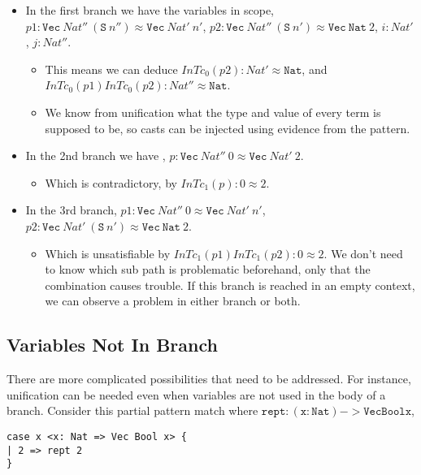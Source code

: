 \begin{itemize}
\item
In the first branch we have the variables in scope, $p1:\mathtt{Vec}\ Nat''\ (\mathtt{S}\ n'')\approx\mathtt{Vec}\ Nat'\ n'$, $p2:\mathtt{Vec}\ Nat''\ (\mathtt{S}\ n')\approx\mathtt{Vec}\ \mathtt{Nat}\ 2$, $i:Nat'$, $j:Nat''$.
\begin{itemize}
\item
This means we can deduce $InTc_{0}(p2):Nat'\approx\mathtt{Nat}$, and $InTc_{0}(p1)InTc_{0}(p2):Nat''\approx\mathtt{Nat}$.
\item
We know from unification what the type and value of every term is supposed to be, so casts can be injected using evidence from the pattern.
\end{itemize}
\item
In the 2nd branch we have , $p:\mathtt{Vec}\ Nat''\ 0\approx\mathtt{Vec}\ Nat'\ 2$.
\begin{itemize}
\item
Which is contradictory, by $InTc_{1}(p):0\approx2$.
\end{itemize}
\item
{}
In the 3rd branch, $p1:\mathtt{Vec}\ Nat''\ 0\approx\mathtt{Vec}\ Nat'\ n'$, $p2:\mathtt{Vec}\ Nat'\ (\mathtt{S}\ n')\approx\mathtt{Vec}\ \mathtt{Nat}\ 2$.
\begin{itemize}
\item
Which is unsatisfiable by $InTc_{1}(p1)InTc_{1}(p2):0\approx2$.
We don't need to know which sub path is problematic beforehand, only that the combination causes trouble.
If this branch is reached in an empty context, we can observe a problem in either branch or both.
\end{itemize}
\end{itemize}
 
\subsection{Variables Not In Branch}
There are more complicated possibilities that need to be addressed.
For instance, unification can be needed even when variables are not used in the body of a branch.
Consider this partial pattern match where $\mathtt{rept: (x: Nat) -> Vec Bool x}$,
 
\begin{lstlisting}[basicstyle={\ttfamily\small}]
case x <x: Nat => Vec Bool x> {
| 2 => rept 2
}
\end{lstlisting}
 
